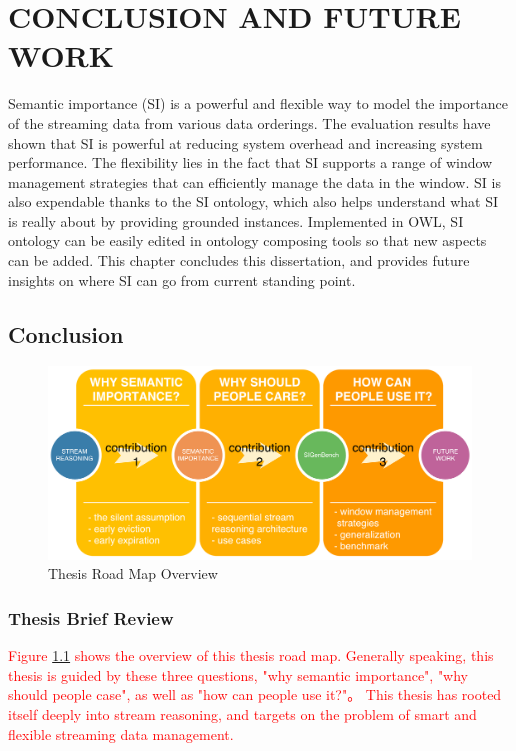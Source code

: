  
\chapter{CONCLUSION AND FUTURE WORK}
Semantic importance (SI) is a powerful and flexible way to model the importance of the streaming data from various data orderings.
The evaluation results have shown that SI is powerful at reducing system overhead and increasing system performance. 
The flexibility lies in the fact that SI supports a range of window management strategies that can efficiently manage the data in the window. 
SI is also expendable thanks to the SI ontology, which also helps understand what SI is really about by providing grounded instances.
Implemented in OWL, SI ontology can be easily edited in ontology composing tools so that new aspects can be added. 
This chapter concludes this dissertation, and provides future insights on where SI can go from current standing point. 
%
\section{Conclusion}

\begin{figure}[!htbp]
	\centering
    \includegraphics[width=5.5in]{img/7-trm.pdf}
    \caption{Thesis Road Map Overview}
    \label{fig:7-trm}
\end{figure}
%
\subsection{Thesis Brief Review}
\textcolor{red}{
Figure \ref{fig:7-trm} shows the overview of this thesis road map. 
Generally speaking, this thesis is guided by these three questions, 
"why semantic importance", "why should people case", as well as "how can people use it?"。
This thesis has rooted itself deeply into stream reasoning, and targets on the problem of smart and flexible streaming data management. 
}

